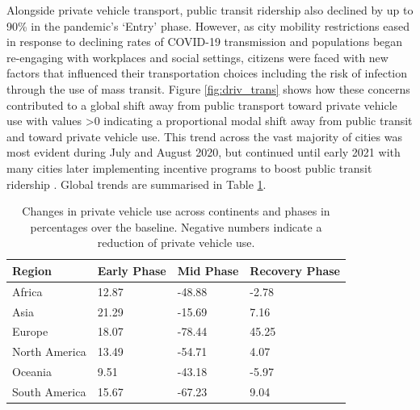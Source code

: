 \documentclass[preprint,10pt]{elsarticle} %
\begin{document}
Alongside private vehicle transport, public transit ridership also declined by up to 90\% in the pandemic's `Entry' phase\cite{TransitCovid_Gkiotsalitis}. However, as city mobility restrictions eased in response to declining rates of COVID-19 transmission and populations began re-engaging with workplaces and social settings, citizens were faced with new factors that influenced their transportation choices including the risk of infection through the use of mass transit\cite{BECKTransit}. Figure \ref{fig:driv_trans} shows how these concerns contributed to a global shift away from public transport toward private vehicle use with values \textgreater 0 indicating a proportional modal shift away from public transit and toward private vehicle use. This trend across the vast majority of cities was most evident during July and August 2020, but continued until early 2021 with many cities later implementing incentive programs to boost public transit ridership \cite{dai2021improving}. Global trends are summarised in Table \ref{tab:driving}.

\begin{table}
\caption{Changes in private vehicle use across continents and phases in percentages over the baseline. Negative numbers indicate a reduction of private vehicle use.}
\begin{tabular}{ |l|l|l|l| }
\hline
\textbf{Region} & \textbf{Early Phase} & \textbf{Mid Phase} & \textbf{Recovery Phase}  \\ 
\hline
Africa         & \cellcolor{red!12}12.87 & \cellcolor{blue!15}-48.88 & \cellcolor{blue!10}-2.78  \\ \hline
Asia           & \cellcolor{red!15}21.29 & \cellcolor{blue!10}-15.69 & \cellcolor{red!10} 7.16  \\ \hline
Europe         & \cellcolor{red!13}18.07 & \cellcolor{blue!20}-78.44 & \cellcolor{red!25} 45.25  \\ \hline
North America  & \cellcolor{red!12}13.49 & \cellcolor{blue!16}-54.71 & \cellcolor{red!10}4.07  \\ \hline
Oceania        &  \cellcolor{red!10}9.51 & \cellcolor{blue!15}-43.18 & \cellcolor{blue!10}-5.97  \\ \hline
South America  & \cellcolor{red!12}15.67 & \cellcolor{blue!18}-67.23 & \cellcolor{red!10}9.04  \\ \hline
\end{tabular}\label{tab:driving}
\end{table}
\end{document}
